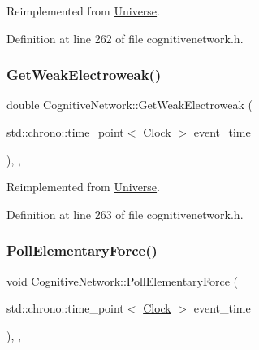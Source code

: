 Reimplemented from \hyperlink{class_universe_a4476b7e0a3fc1764909f556257fd9ec7}{Universe}.



Definition at line 262 of file cognitivenetwork.\+h.

\mbox{\label{class_cognitive_network_aa6342c390fe8e7c648b4c6bc8f93ba4a}} 
\subsubsection{\texorpdfstring{Get\+Weak\+Electroweak()}{GetWeakElectroweak()}}
{\footnotesize\ttfamily double Cognitive\+Network\+::\+Get\+Weak\+Electroweak (\begin{DoxyParamCaption}\item[{std\+::chrono\+::time\+\_\+point$<$ \hyperlink{universe_8h_a0ef8d951d1ca5ab3cfaf7ab4c7a6fd80}{Clock} $>$}]{event\+\_\+time }\end{DoxyParamCaption})\hspace{0.3cm}{\ttfamily [inline]}, {\ttfamily [final]}, {\ttfamily [virtual]}}



Reimplemented from \hyperlink{class_universe_a645299738e6b798a037f2a15a2e7cf4d}{Universe}.



Definition at line 263 of file cognitivenetwork.\+h.

\mbox{\label{class_cognitive_network_ac97c08a0af7dc0d02fbe059827b6be87}} 
\subsubsection{\texorpdfstring{Poll\+Elementary\+Force()}{PollElementaryForce()}}
{\footnotesize\ttfamily void Cognitive\+Network\+::\+Poll\+Elementary\+Force (\begin{DoxyParamCaption}\item[{std\+::chrono\+::time\+\_\+point$<$ \hyperlink{universe_8h_a0ef8d951d1ca5ab3cfaf7ab4c7a6fd80}{Clock} $>$}]{event\+\_\+time }\end{DoxyParamCaption})\hspace{0.3cm}{\ttfamily [inline]}, {\ttfamily [final]}, {\ttfamily [virtual]}}



